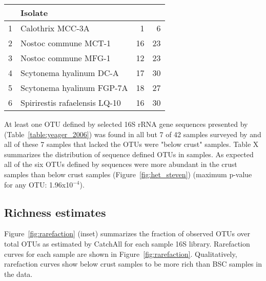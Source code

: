 \begin{table}[ht]
\centering
\begin{tabular}{rlrr}
  \hline
 & Isolate & \citet{Garcia_Pichel_2013} & \citet{Steven_2013} \\ 
  \hline
1 & Calothrix MCC-3A &   1 &   6 \\ 
  2 & Nostoc commune MCT-1 &  16 &  23 \\ 
  3 & Nostoc commune MFG-1 &  12 &  23 \\ 
  4 & Scytonema hyalinum DC-A &  17 &  30 \\ 
  5 & Scytonema hyalinum FGP-7A &  18 &  27 \\ 
  6 & Spirirestis rafaelensis LQ-10 &  16 &  30 \\ 
   \hline
\end{tabular}
\end{table}


At least one OTU defined by selected 16S rRNA gene sequences presented by
\citet{Yeager} (Table~\ref{table:yeager_2006}) was found in all but 7 of 42
samples surveyed by \citet{Steven_2013} and all of these 7 samples that lacked
the \citet{Yeager} OTUs were "below crust" samples. Table X summarizes the
distribution of \citet{Yeager} sequence defined OTUs in \citet{Steven_2013}
samples. As expected all of the six OTUs defined by \citet{Yeager} sequences
were more abundant in the crust samples than below crust samples
(Figure~\ref{fig:het_steven}) (maximum p-value for any OTU: 1.96x10$^{-4}$).

\subsection{Richness estimates}
Figure~\ref{fig:rarefaction} (inset) summarizes the fraction of observed OTUs
over total OTUs as estimated by CatchAll for each sample 16S library.
Rarefaction curves for each sample are shown in Figure~\ref{fig:rarefaction}.
Qualitatively, rarefaction curves show below crust samples to be more rich than
BSC samples in the \citet{Steven_2013} data.
